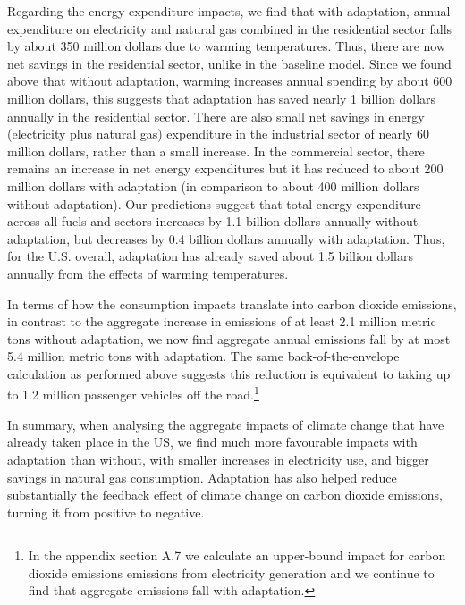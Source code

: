 \documentclass[11pt]{article}
\begin{document}
Regarding the energy expenditure impacts, we find that with adaptation, annual expenditure on electricity and natural gas combined in the residential sector falls by about 350 million dollars due to warming temperatures. Thus, there are now net savings in the residential sector, unlike in the baseline model. Since we found above that without adaptation, warming increases annual spending by about 600 million dollars, this suggests that adaptation has saved nearly 1 billion dollars annually in the residential sector. There are also small net savings in energy (electricity plus natural gas) expenditure in the industrial sector of nearly 60 million dollars, rather than a small increase. In the commercial sector, there remains an increase in net energy expenditures but it has reduced to about 200 million dollars with adaptation (in comparison to about 400 million dollars without adaptation). Our predictions suggest that total energy expenditure across all fuels and sectors increases by 1.1 billion dollars annually without adaptation, but decreases by 0.4 billion dollars annually with adaptation. Thus, for the U.S. overall, adaptation has already saved about 1.5 billion dollars annually from the effects of warming temperatures. 

In terms of how the consumption impacts translate into carbon dioxide emissions, %
in contrast to the aggregate increase in emissions of at least 2.1 million metric tons without adaptation, we now find aggregate annual emissions fall by at most 5.4 million metric tons with adaptation. The same back-of-the-envelope calculation as performed above suggests this reduction is equivalent to taking up to 1.2 million passenger vehicles off the road.\footnote{In the appendix section A.7 we calculate an upper-bound impact for carbon dioxide emissions emissions from electricity generation and we continue to find that aggregate emissions fall with adaptation.}

In summary, when analysing the aggregate impacts of climate change that have already taken place in the US, we find much more favourable impacts with adaptation than without, with smaller increases in electricity use, and bigger savings in natural gas consumption. Adaptation has also helped reduce substantially the feedback effect of climate change on carbon dioxide emissions, turning it from positive to negative. 
\end{document}
